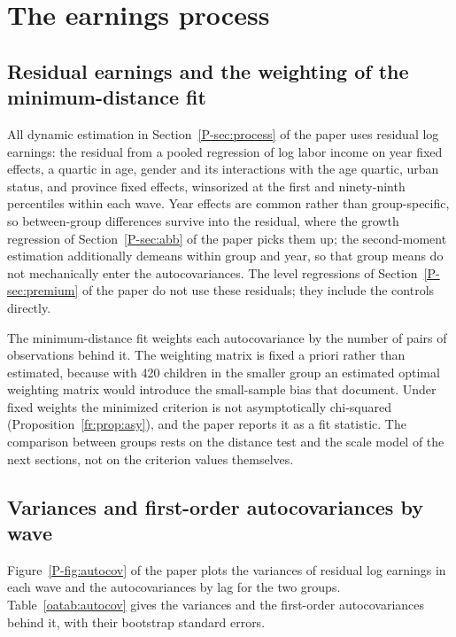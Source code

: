 \documentclass[11pt]{article}
\numberwithin{equation}{section}
\begin{document}
\section{The earnings process}
\label{oa:process}

\subsection{Residual earnings and the weighting of the minimum-distance fit}

All dynamic estimation in Section~\ref{P-sec:process} of the paper uses residual log earnings: the residual from a pooled regression of log labor income on year fixed effects, a quartic in age, gender and its interactions with the age quartic, urban status, and province fixed effects, winsorized at the first and ninety-ninth percentiles within each wave. Year effects are common rather than group-specific, so between-group differences survive into the residual, where the growth regression of Section~\ref{P-sec:abb} of the paper picks them up; the second-moment estimation additionally demeans within group and year, so that group means do not mechanically enter the autocovariances. The level regressions of Section~\ref{P-sec:premium} of the paper do not use these residuals; they include the controls directly.

The minimum-distance fit weights each autocovariance by the number of pairs of observations behind it. The weighting matrix is fixed a priori rather than estimated, because with 420 children in the smaller group an estimated optimal weighting matrix would introduce the small-sample bias that \citet{AltonjiSegal1996} document. Under fixed weights the minimized criterion is not asymptotically chi-squared (Proposition~\ref{fr:prop:asy}), and the paper reports it as a fit statistic. The comparison between groups rests on the distance test and the scale model of the next sections, not on the criterion values themselves.

\subsection{Variances and first-order autocovariances by wave}
\label{oa:autocov}

Figure~\ref{P-fig:autocov} of the paper plots the variances of residual
log earnings in each wave and the autocovariances by lag for the two
groups. Table~\ref{oatab:autocov} gives the variances and the
first-order autocovariances behind it, with their bootstrap standard
errors.
\end{document}
